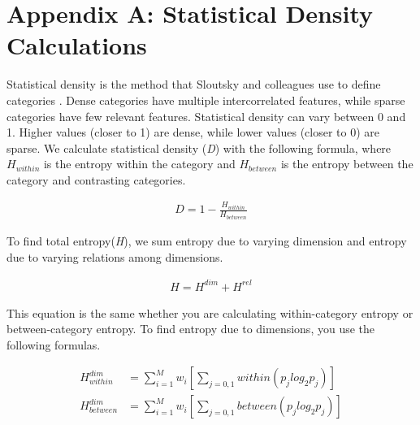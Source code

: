 \documentclass[../dissertation.tex]{subfiles}
\begin{document}
\section{Appendix A: Statistical Density Calculations}

Statistical density is the method that Sloutsky and colleagues use to define categories \cite{Sloutsky2010}. Dense categories have multiple intercorrelated features, while sparse categories have few relevant features. Statistical density can vary between 0 and 1. Higher values (closer to 1) are dense, while lower values (closer to 0) are sparse. We calculate statistical density (\textit{D}) with the following formula, where $H_{within}$ is the entropy within the category and $H_{between}$ is the entropy between the category and contrasting categories.

\begin{align*}
D = 1 - \frac{H_{within}}{H_{between}}
\end{align*}

To find total entropy(\textit{H}), we sum entropy due to varying dimension and entropy due to varying relations among dimensions.

\begin{align*}
H = H^{dim} + H^{rel}
\end{align*}

This equation is the same whether you are calculating within-category entropy or between-category entropy. To find entropy due to dimensions, you use the following formulas.

\begin{align*}
H^{dim}_{within} &= \sum_{i=1}^{M}w_{i}[\sum_{j=0,1}within(p_{j}log_{2}p_{j})]\\
H^{dim}_{between} &= \sum_{i=1}^{M}w_{i}[\sum_{j=0,1}between(p_{j}log_{2}p_{j})]
\end{align*}
\end{document}
